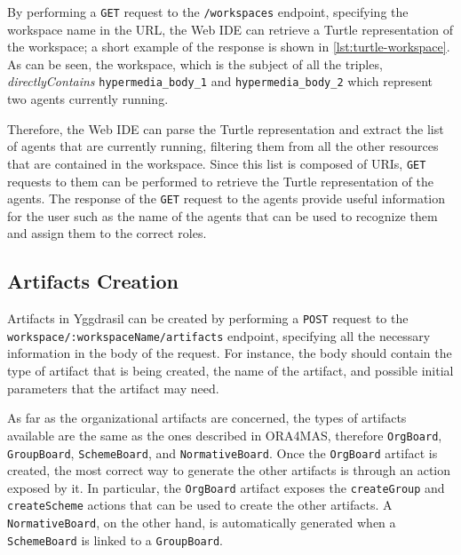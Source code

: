 By performing a \texttt{GET} request to the \texttt{/workspaces} endpoint, specifying the workspace name in the URL, the Web IDE can retrieve a Turtle representation of the workspace; a short example of the response is shown in \cref{lst:turtle-workspace}.
As can be seen, the workspace, which is the subject of all the triples, \textit{directlyContains} \texttt{hypermedia\_body\_1} and \texttt{hypermedia\_body\_2} which represent two agents currently running.

\begin{figure}
    
\end{figure}

Therefore, the Web IDE can parse the Turtle representation and extract the list of agents that are currently running, filtering them from all the other resources that are contained in the workspace.
Since this list is composed of URIs, \texttt{GET} requests to them can be performed to retrieve the Turtle representation of the agents.
The response of the \texttt{GET} request to the agents provide useful information for the user such as the name of the agents that can be used to recognize them and assign them to the correct roles.

\subsection{Artifacts Creation}
Artifacts in Yggdrasil can be created by performing a \texttt{POST} request to the \texttt{workspace/:workspaceName/artifacts} endpoint, specifying all the necessary information in the body of the request.
For instance, the body should contain the type of artifact that is being created, the name of the artifact, and possible initial parameters that the artifact may need.

As far as the organizational artifacts are concerned, the types of artifacts available are the same as the ones described in \textsf{ORA4MAS}, therefore \texttt{OrgBoard}, \texttt{GroupBoard}, \texttt{SchemeBoard}, and \texttt{NormativeBoard}.
Once the \texttt{OrgBoard} artifact is created, the most correct way to generate the other artifacts is through an action exposed by it.
In particular, the \texttt{OrgBoard} artifact exposes the \texttt{createGroup} and \texttt{createScheme} actions that can be used to create the other artifacts.
A \texttt{NormativeBoard}, on the other hand, is automatically generated when a \texttt{SchemeBoard} is linked to a \texttt{GroupBoard}.


